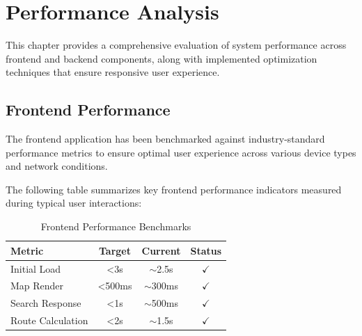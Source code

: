 \chapter{Performance Analysis}

This chapter provides a comprehensive evaluation of system performance across frontend and backend components, along with implemented optimization techniques that ensure responsive user experience.

\section{Frontend Performance}

The frontend application has been benchmarked against industry-standard performance metrics to ensure optimal user experience across various device types and network conditions.

The following table summarizes key frontend performance indicators measured during typical user interactions:

\begin{table}[H]
\centering
\begin{tabular}{|l|c|c|c|}
\hline
\textbf{Metric} & \textbf{Target} & \textbf{Current} & \textbf{Status} \\
\hline
Initial Load & <3s & $\sim$2.5s & $\checkmark$ \\
Map Render & <500ms & $\sim$300ms & $\checkmark$ \\
Search Response & <1s & $\sim$500ms & $\checkmark$ \\
Route Calculation & <2s & $\sim$1.5s & $\checkmark$ \\
\hline
\end{tabular}
\caption{Frontend Performance Benchmarks}
\end{table}



